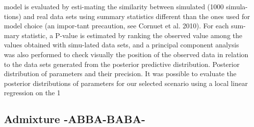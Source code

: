model is evaluated by esti-mating the similarity between simulated (1000 simula-tions) and real data sets using summary statistics different than the ones used for model choice (an impor-tant precaution, see Cornuet et al. 2010). For each sum-mary statistic, a P-value is estimated by ranking the observed value among the values obtained with simu-lated data sets, and a principal component analysis was also performed to check visually the position of the observed data in relation to the data sets generated from the posterior predictive distribution. Posterior distribution of parameters and their precision. It was possible to evaluate the posterior distributions of parameters for our selected scenario using a local linear regression on the 1%

\subsection{Admixture -ABBA-BABA-}

